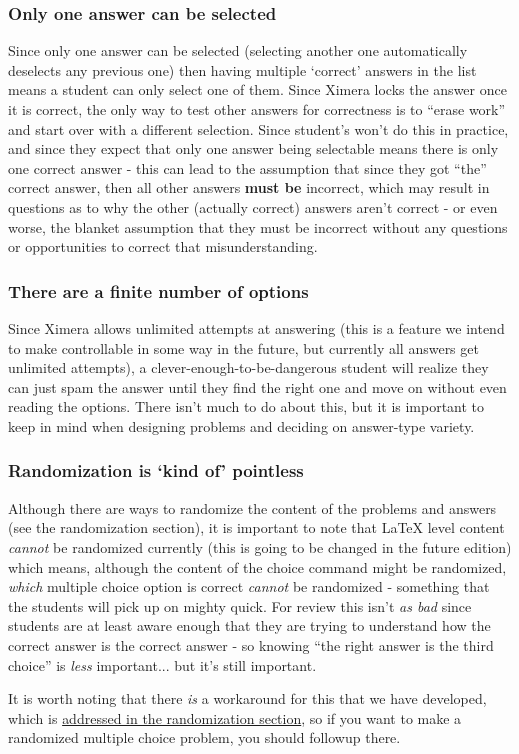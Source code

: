 \documentclass{ximera}
\begin{document}
        \subsubsection*{Only one answer can be selected}
            Since only one answer can be selected (selecting another one automatically deselects any previous one) then having multiple `correct' answers in the list means a student can only select one of them. Since Ximera locks the answer once it is correct, the only way to test other answers for correctness is to ``erase work'' and start over with a different selection. Since student's won't do this in practice, and since they expect that only one answer being selectable means there is only one correct answer - this can lead to the assumption that since they got ``the'' correct answer, then all other answers \textbf{must be} incorrect, which may result in questions as to why the other (actually correct) answers aren't correct - or even worse, the blanket assumption that they must be incorrect without any questions or opportunities to correct that misunderstanding.
            
        \subsubsection*{There are a finite number of options}
            Since Ximera allows unlimited attempts at answering (this is a feature we intend to make controllable in some way in the future, but currently all answers get unlimited attempts), a clever-enough-to-be-dangerous student will realize they can just spam the answer until they find the right one and move on without even reading the options. There isn't much to do about this, but it is important to keep in mind when designing problems and deciding on answer-type variety.
            
        \subsubsection*{Randomization is `kind of' pointless}
            Although there are ways to randomize the content of the problems and answers (see the randomization section), it is important to note that LaTeX level content \textit{cannot} be randomized currently (this is going to be changed in the future edition) which means, although the content of the choice command might be randomized, \textit{which} multiple choice option is correct \textit{cannot} be randomized - something that the students will pick up on mighty quick. For review this isn't \textit{as bad} since students are at least aware enough that they are trying to understand how the correct answer is the correct answer - so knowing ``the right answer is the third choice'' is \textit{less} important... but it's still important.
            
            It is worth noting that there \textit{is} a workaround for this that we have developed, which is \href{https://xronos.clas.ufl.edu/examples/exampleCore/problemDesign/multipleChoice}{addressed in the randomization section}, so if you want to make a randomized multiple choice problem, you should followup there.
            
        
    
\end{document}
